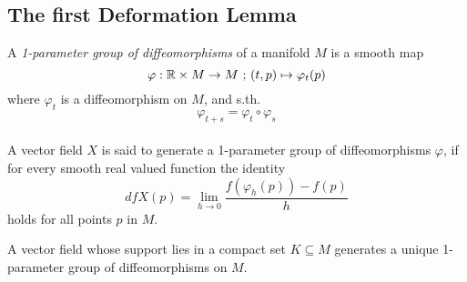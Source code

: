 \subsection{The first Deformation Lemma}

\begin{definition}
   \label{def:1-param group}
   A \textit{1-parameter group of diffeomorphisms} of a manifold $M$ is a 
   smooth map
   \[ \varphi: {\mathbb R} \times M \rightarrow M \text{ ; } (t, p) \mapsto \varphi_t(p) \]
   where $ \varphi_t $ is a diffeomorphism on $M$, and s.th. 
   \[ \varphi_{t+s} = \varphi_t \circ \varphi_s \] \\
   A vector field $X$ is said to generate a 1-parameter group of diffeomorphisms 
   $ \varphi $, if for every smooth real valued function the identity 
   \[ dfX(p) = \lim_{h \to 0} \frac{f(\varphi_h(p)) - f(p)}{h} \]
   holds for all points $p$ in $M$.
\end{definition}

\begin{lemma}
   \label{lemma:vector fields generate 1-parameter groups}
   A vector field whose support lies in a compact set $K \subseteq M$ generates 
   a unique 1-parameter group of diffeomorphisms on $M$.
\end{lemma}

